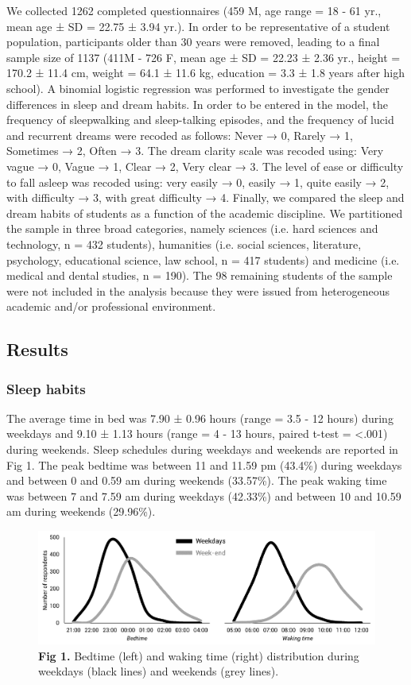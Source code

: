 We collected 1262 completed questionnaires (459 M, age range = 18 - 61 yr., mean age ± SD = 22.75 ± 3.94 yr.). In order to be representative of a student population, participants older than 30 years were removed, leading to a final sample size of 1137 (411M - 726 F, mean age ± SD  = 22.23 ± 2.36 yr., height = 170.2 ± 11.4 cm, weight = 64.1 ± 11.6 kg, education = 3.3 ± 1.8 years after high school). A binomial logistic regression was performed to investigate the gender differences in sleep and dream habits. In order to be entered in the model, the frequency of sleepwalking and sleep-talking episodes, and the frequency of lucid and recurrent dreams were recoded as follows: Never → 0, Rarely → 1, Sometimes → 2, Often → 3. The dream clarity scale was recoded using: Very vague → 0, Vague → 1, Clear → 2, Very clear → 3.  The level of ease or difficulty to fall asleep was recoded using: very easily → 0, easily → 1, quite easily → 2, with difficulty → 3, with great difficulty → 4. Finally, we compared the sleep and dream habits of students as a function of the academic discipline. We partitioned the sample in three broad categories, namely sciences (i.e. hard sciences and technology, n = 432 students), humanities (i.e. social sciences, literature, psychology, educational science, law school, n = 417 students) and medicine (i.e. medical and dental studies, n = 190). The 98 remaining students of the sample were not included in the analysis because they were issued from heterogeneous academic and/or professional environment.

\subsection*{Results}
\label{res:survey:results}

\subsubsection*{Sleep habits}
The average time in bed was 7.90 ± 0.96 hours (range = 3.5 - 12 hours) during weekdays and 9.10 ± 1.13 hours (range = 4 - 13 hours, paired t-test = <.001) during weekends. Sleep schedules during weekdays and weekends are reported in Fig 1. The peak bedtime was between 11 and 11.59 pm (43.4\%) during weekdays and between 0 and 0.59 am during weekends (33.57\%). The peak waking time was between 7 and 7.59 am during weekdays (42.33\%) and between 10 and 10.59 am during weekends (29.96\%).

\begin{figure}[htb]
	\includegraphics[width=\textwidth]{Fig/Results/Survey/Fig1.png}
	\caption*{\textbf{Fig 1.} Bedtime (left) and waking time (right) distribution during weekdays (black lines) and weekends (grey lines).}
\end{figure}

